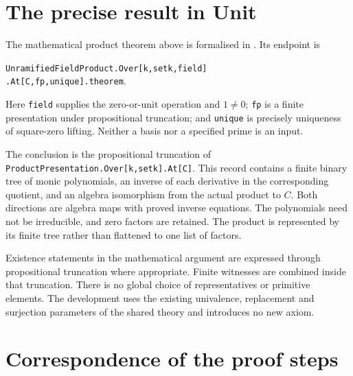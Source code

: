 \documentclass[11pt]{article}
\theoremstyle{definition}
\theoremstyle{remark}
\begin{document}
\section{The precise result in Unit}

The mathematical product theorem above is formalised in
. Its endpoint is
\begin{center}
\texttt{UnramifiedFieldProduct.Over[k,setk,field]}\\
\texttt{.At[C,fp,unique].theorem}.
\end{center}
Here \texttt{field} supplies the zero-or-unit operation and $1\ne0$;
\texttt{fp} is a finite presentation under propositional truncation;
and \texttt{unique} is precisely uniqueness of square-zero lifting.
Neither a basis nor a specified prime is an input.

The conclusion is the propositional truncation of
\texttt{ProductPresentation.Over[k,setk].At[C]}.
This record contains a finite binary tree of monic polynomials,
an inverse of each derivative in the corresponding quotient, and
an algebra isomorphism from the actual product to $C$.
Both directions are algebra maps with proved inverse equations.
The polynomials need not be irreducible, and zero factors are retained.
The product is represented by its finite tree rather than flattened
to one list of factors.

Existence statements in the mathematical argument are expressed
through propositional truncation where appropriate. Finite witnesses
are combined inside that truncation. There is no global choice of
representatives or primitive elements. The development uses the
existing univalence, replacement and surjection parameters of the
shared theory and introduces no new axiom.

\section{Correspondence of the proof steps}
\end{document}
